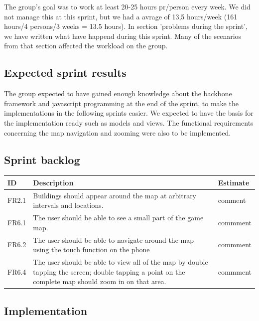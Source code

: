 	The group's goal was to work at least 20-25 hours pr/person every week. We did not manage this at this sprint, but we had a avrage of 13,5 hours/week (161 hours/4 persons/3 weeks = 13.5 hours). 
	In section 'problems during the sprint', we have written what have happend during this sprint.
	Many of the scenarios from that section affected the workload on the group. 

\subsection{Expected sprint results}

	The group expected to have gained enough knowledge about the backbone framework and javascript programming at the end of the sprint, to make the implementations in the following sprints easier. We expected to have the basis for the implementation ready such as models and views. The functional requirements concerning the map navigation and zooming were also to be implemented.

\subsection{Sprint backlog}
\begin{tabular}{| p{1cm} | p{8cm} | p{3cm} |}
	\hline
	\rowcolor{gray}
	ID & Description & Estimate \\ \hline
	FR2.1 & Buildings should appear around the map at arbitrary intervals and locations. & comment \\ \hline
	FR6.1 & The user should be able to see a small part of the game map. & commment \\ \hline
	FR6.2 & The user should be able to navigate around the map using the touch function on the phone & commment \\ \hline
	FR6.4 & The user should be able to view all of the map by double tapping the screen; double tapping a point on the complete map should zoom in on that area. & commment \\
	\hline
\end{tabular}

\subsection{Implementation}

